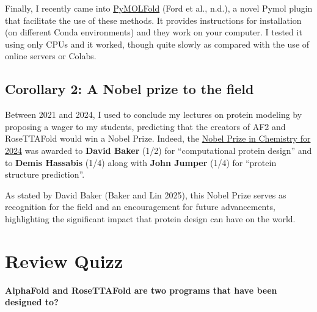 \documentclass[
]{scrbook}
\begin{document}
Finally, I recently came into
\href{https://github.com/colbyford/PyMOLfold}{PyMOLFold} (Ford et al.,
n.d.), a novel Pymol plugin that facilitate the use of these methods. It
provides instructions for installation (on different Conda environments)
and they work on your computer. I tested it using only CPUs and it
worked, though quite slowly as compared with the use of online servers
or Colabs.

\begin{centering}\begin{tcolorbox}[hbox,
colframe=lightgray,
colback=white]

\textcolor{ProcessBlue}{{\Large {\faTwitterSquare}}} %

\href{https://twitter.com/c01_by/status/1867227053197574556}{}

\end{tcolorbox}\end{centering}
\vspace{1em}

\section{Corollary 2: A Nobel prize to the
field}\label{corollary-2-a-nobel-prize-to-the-field}

Between 2021 and 2024, I used to conclude my lectures on protein
modeling by proposing a wager to my students, predicting that the
creators of AF2 and RoseTTAFold would win a Nobel Prize. Indeed, the
\href{https://www.nobelprize.org/prizes/chemistry/2024/press-release/}{Nobel
Prize in Chemistry for 2024} was awarded to \textbf{David Baker} (1/2)
for ``computational protein design'' and to \textbf{Demis Hassabis}
(1/4) along with \textbf{John Jumper} (1/4) for ``protein structure
prediction''.

As stated by David Baker (Baker and Lin 2025), this Nobel Prize serves
as recognition for the field and an encouragement for future
advancements, highlighting the significant impact that protein design
can have on the world.

\chapter{\texorpdfstring{{Review Quizz}}{Review Quizz}}\label{quizz}

\textbf{AlphaFold and RoseTTAFold are two programs that have been
designed to?}
\end{document}
